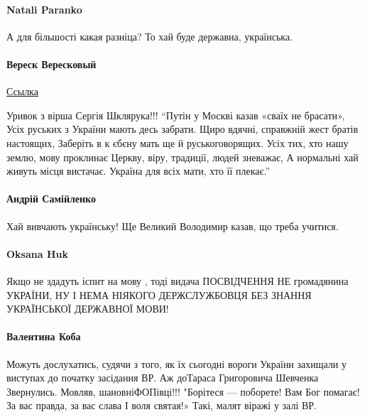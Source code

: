 \paragraph{Natali Paranko}
А для більшості какая разніца? То хай буде державна, українська.

\paragraph{Вереск Вересковый}
\href{https://www.facebook.com/profile.php?id=100026095720110&comment_id=Y29tbWVudDozNTY1Mjg1OTQwMTc1ODQ5XzM1NjU2NzQ4MzM0NzAyOTM%3D&__cft__[0]=AZXh9Wpmphhexq5-lKXWN0nHntp5tFgLubIoq71v8DN7O2Tmj2sC3toi8qyiSdjseCvI5FIi00eDafvumw_YkeZ3SEGgaWWYQxZFQhDzg8hI1GyLB7FyeHFoHtP0uThOVcI&__tn__=R]-R}{Ссылка}


Уривок з вірша Сергія Шклярука!!! \enquote{Путін у Москві казав «сваїх не брасати»,
Усіх руських з України мають десь забрати.
Щиро вдячні, справжній жест братів настоящих,
Заберіть в к єбєну мать ще й руськоговорящих.
Усіх тих, хто нашу землю, мову проклинає
Церкву, віру, традиції, людей зневажає,
А нормальні хай живуть місця вистачає.
Україна для всіх мати, хто її плекає.} 

\paragraph{Андрій Самійленко}
Хай вивчають українську! Ще Великий Володимир казав, що треба учитися.

\paragraph{Oksana Huk}

Якщо не здадуть іспит на мову , тоді видача ПОСВІДЧЕННЯ НЕ громадянина УКРАЇНИ,
НУ І НЕМА НІЯКОГО ДЕРЖСЛУЖБОВЦЯ БЕЗ ЗНАННЯ УКРАЇНСЬКОЇ ДЕРЖАВНОЇ МОВИ!

\paragraph{Валентина Коба}

Можуть дослухатись, судячи з того, як їх сьогодні вороги України захищали у
виступах до початку засідання ВР. Аж доТараса Григоровича Шевченка Звернулись.
Мовляв, шановніФОПівці!!! "Борітеся --- поборете!
Вам Бог помагає!
За вас правда, за вас слава
І воля святая!»
Такі, малят віражі у залі ВР.

